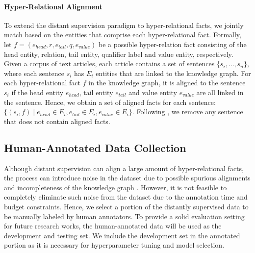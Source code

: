 \documentclass[11pt]{article}
\begin{document}
\paragraph{Hyper-Relational Alignment}
To extend the distant supervision paradigm to hyper-relational facts, we jointly match based on the entities that comprise each hyper-relational fact.
Formally, let $f = (e_{head}, r, e_{tail}, q, e_{value})$ be a possible hyper-relation fact consisting of the head entity, relation, tail entity, qualifier label and value entity, respectively.
Given a corpus of text articles, each article contains a set of sentences $\{s_i, ..., s_n\}$, where each sentence $s_i$ has $E_i$ entities that are linked to the knowledge graph.
For each hyper-relational fact $f$ in the knowledge graph, it is aligned to the sentence $s_i$ if the head entity $e_{head}$, tail entity $e_{tail}$ and value entity $e_{value}$ are all linked in the sentence.
Hence, we obtain a set of aligned facts for each sentence:  $\{(s_i, f) \mid e_{head} \in E_i, e_{tail} \in E_i, e_{value} \in E_i\}$.
Following \citet{10.1007/978-3-642-15939-8_10}, we remove any sentence that does not contain aligned facts.


\subsection{Human-Annotated Data Collection}
\label{sec:human}
Although distant supervision can align a large amount of hyper-relational facts, the process can introduce noise in the dataset due to possible spurious alignments and incompleteness of the knowledge graph \citep{7358050}.
However, it is not feasible to completely eliminate such noise from the dataset due to the annotation time and budget constraints.
Hence, we select a portion of the distantly supervised data to be manually labeled by human annotators.
To provide a solid evaluation setting for future research works, the human-annotated data will be used as the development and testing set.
We include the development set in the annotated portion as it is necessary for hyperparameter tuning and model selection.
\end{document}

